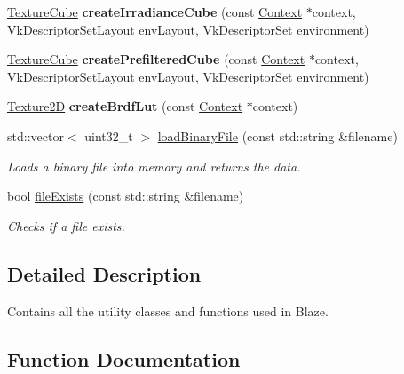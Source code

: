 \begin{DoxyCompactItemize}
\hyperlink{classblaze_1_1TextureCube}{Texture\+Cube} {\bfseries create\+Irradiance\+Cube} (const \hyperlink{classblaze_1_1Context}{Context} $\ast$context, Vk\+Descriptor\+Set\+Layout env\+Layout, Vk\+Descriptor\+Set environment)
\item 
\mbox{\label{namespaceblaze_1_1util_a2701849e960ca0f4f23dbe65b6a7e1de}} 
\hyperlink{classblaze_1_1TextureCube}{Texture\+Cube} {\bfseries create\+Prefiltered\+Cube} (const \hyperlink{classblaze_1_1Context}{Context} $\ast$context, Vk\+Descriptor\+Set\+Layout env\+Layout, Vk\+Descriptor\+Set environment)
\item 
\mbox{\label{namespaceblaze_1_1util_a2046635ad227e3c16e6565535d16c52a}} 
\hyperlink{classblaze_1_1Texture2D}{Texture2D} {\bfseries create\+Brdf\+Lut} (const \hyperlink{classblaze_1_1Context}{Context} $\ast$context)
\item 
std\+::vector$<$ uint32\+\_\+t $>$ \hyperlink{namespaceblaze_1_1util_a0157eaabde62d86926906bb797d7ada8}{load\+Binary\+File} (const std\+::string \&filename)
\begin{DoxyCompactList}\small\item\em Loads a binary file into memory and returns the data. \end{DoxyCompactList}\item 
bool \hyperlink{namespaceblaze_1_1util_a33c7b989ef9f0b2f56ca8632cd6784c5}{file\+Exists} (const std\+::string \&filename)
\begin{DoxyCompactList}\small\item\em Checks if a file exists. \end{DoxyCompactList}\end{DoxyCompactItemize}


\subsection{Detailed Description}
Contains all the utility classes and functions used in Blaze. 

\subsection{Function Documentation}
\mbox{\label{namespaceblaze_1_1util_aba6d1d4fa38d54444eb861c08919af34}} 
